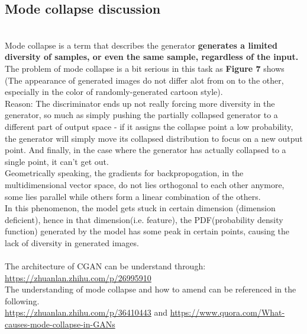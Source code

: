 \documentclass[11pt, a4paper]{article} %
\begin{document}
\subsection{Mode collapse discussion}
\\ Mode collapse is a term that describes the generator \textbf{generates a limited diversity of samples, or even the same sample, regardless of the input.}
\\ The problem of mode collapse is a bit serious in this task as \textbf{Figure 7} shows (The appearance of generated images do not differ alot from on to the other, especially in the color of randomly-generated cartoon style).
\\ Reason: The discriminator ends up not really forcing more diversity in the generator, so much as simply pushing the partially collapsed generator to a different part of output space - if it assigns the collapse point a low probability, the generator will simply move its collapsed distribution to focus on a new output point. And finally, in the case where the generator has actually collapsed to a single point, it can’t get out.
\\ Geometrically speaking, the gradients for backpropogation, in the multidimensional vector space, do not lies orthogonal to each other anymore, some lies parallel while others form a linear combination of the others.   
\\ In this phenomenon, the model gets stuck in certain dimension (dimension deficient), hence in that dimension(i.e. feature), the PDF(probability density function) generated by the model has some peak in certain points, causing the lack of diversity in generated images. 
\\
\\ The architecture of CGAN can be understand through: \url{https://zhuanlan.zhihu.com/p/26995910}
\\ The understanding of mode collapse and how to amend can be referenced in the following. 
\\ \url{https://zhuanlan.zhihu.com/p/36410443} and \url{https://www.quora.com/What-causes-mode-collapse-in-GANs}
\end{document}
